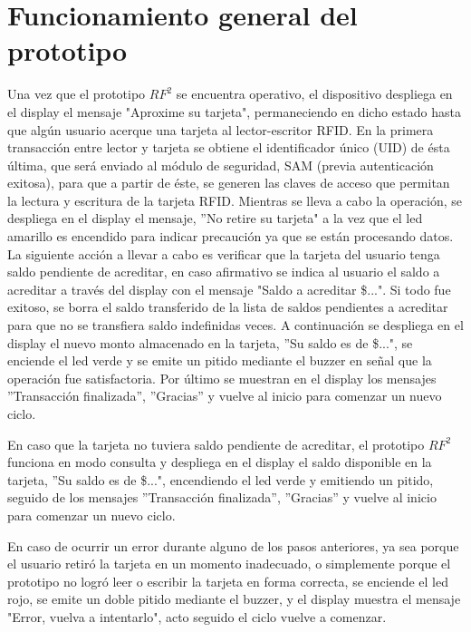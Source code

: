 \section{Funcionamiento general del prototipo}
Una vez que el prototipo $RF^{2}$ se encuentra operativo, el dispositivo despliega en el display el mensaje "Aproxime su tarjeta", permaneciendo en dicho estado hasta que algún usuario acerque una tarjeta al lector-escritor RFID. 
En la primera transacción entre lector y tarjeta se obtiene el identificador único (UID) de ésta última, que será enviado al módulo de seguridad, SAM (previa autenticación exitosa), para que a partir de éste, se generen las claves de acceso que permitan la lectura y escritura de la tarjeta RFID.
Mientras se lleva a cabo la operación, se despliega en el display el mensaje, ”No retire su tarjeta" a la vez que el led amarillo es encendido para indicar precaución ya que se están procesando datos.
La siguiente acción a llevar a cabo es verificar que la tarjeta del usuario tenga saldo pendiente de acreditar, en caso afirmativo se indica al usuario el saldo a acreditar a través del display con el mensaje "Saldo a acreditar \$...". Si todo fue exitoso, se borra el saldo transferido de la lista de saldos pendientes a acreditar para que no se transfiera saldo indefinidas veces.
A continuación se despliega en el display el nuevo monto almacenado en la tarjeta, ”Su saldo es de \$...", se enciende el led verde y se emite un pitido mediante el buzzer en señal que la operación fue satisfactoria.
Por último se muestran en el display los mensajes ”Transacción finalizada”, ”Gracias” y vuelve al inicio para comenzar un nuevo ciclo.

En caso que la tarjeta no tuviera saldo pendiente de acreditar, el prototipo $RF^{2}$ funciona en modo consulta y despliega en el display el saldo disponible en la tarjeta, ”Su saldo es de \$...", encendiendo el led verde y emitiendo un pitido, seguido de los mensajes ”Transacción finalizada”, ”Gracias” y vuelve al inicio para comenzar un nuevo ciclo.

En caso de ocurrir un error durante alguno de los pasos anteriores, ya sea porque
el usuario retiró la tarjeta en un momento inadecuado, o simplemente porque el prototipo
no logró leer o escribir la tarjeta en forma correcta, se enciende el led rojo, se emite un
doble pitido mediante el buzzer, y el display muestra el mensaje "Error, vuelva a intentarlo",
acto seguido el ciclo vuelve a comenzar. 